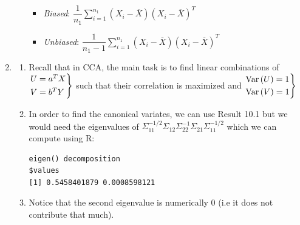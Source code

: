 \begin{enumerate}[label=\arabic*.,leftmargin=*]
\begin{enumerate}[label=\alph*),leftmargin=*]
        \begin{itemize}
          \item\textit{Biased}: $\dfrac{1}{n_1}\sum_{i=1}^{n_1}(X_i-\overline{X})(X_i-\overline{X})^T$
          \item\textit{Unbiased}: $\dfrac{1}{n_1-1}\sum_{i=1}^{n_1}(X_i-\overline{X})(X_i-\overline{X})^T$
        \end{itemize}
    \end{enumerate}
    \par\bigskip
    \item
    \begin{enumerate}[label=\alph*),leftmargin=*]
  \item Recall that in CCA, the main task is to find linear combinations of $\begin{rcases*}U = a^TX\\V=b^TY\end{rcases*}$ such that their correlation is maximized and $\begin{rcases*}\text{Var}\left(U\right)=1\\\text{Var}\left(V\right)=1\end{rcases*}$ 
    \par\bigskip
    \item\noindent In order to find the canonical variates, we can use Result 10.1 but we would need the eigenvalues of $\Sigma_{11}^{-1/2}\Sigma_{12}\Sigma_{22}^{-1}\Sigma_{21}\Sigma_{11}^{-1/2}$ which we can compute using R:
    \par\bigskip
\begin{verbatim}
eigen() decomposition
$values
[1] 0.5458401879 0.0008598121
\end{verbatim}
    \par\bigskip
  \item 
    \noindent Notice that the second eigenvalue is numerically 0 (i.e it does not contribute that much).
  \end{enumerate}
  \par\bigskip
\end{enumerate}
\newpage

